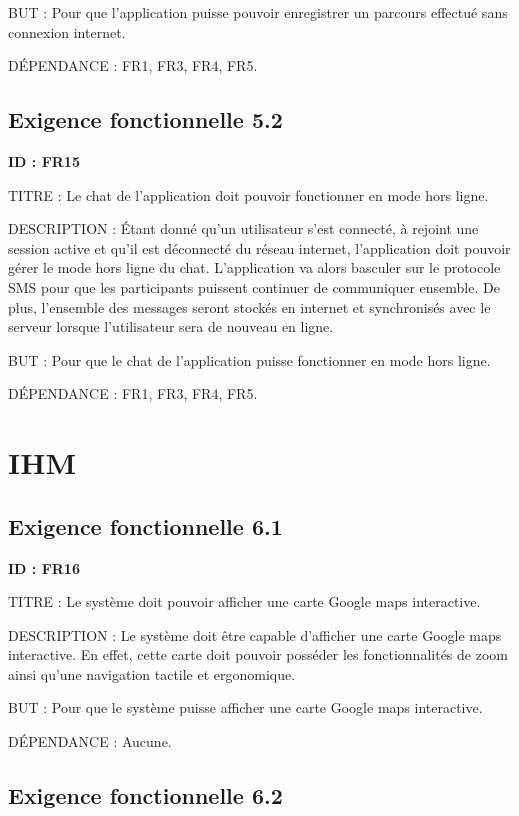 \documentclass[titlepage, 12pt]{report}
\begin{document}
BUT : Pour que l'application puisse pouvoir enregistrer un parcours effectué sans connexion internet. 

DÉPENDANCE : FR1, FR3, FR4, FR5.

\subsection{Exigence fonctionnelle 5.2}

\textbf{ID : FR15}

TITRE : Le chat de l'application doit pouvoir fonctionner en mode hors ligne.

DESCRIPTION : Étant donné qu'un utilisateur s'est connecté, à rejoint une session active et qu'il est déconnecté du réseau internet, l'application doit pouvoir gérer le mode hors ligne du chat. L'application va alors basculer sur le protocole SMS pour que les participants puissent continuer de communiquer ensemble. De plus, l'ensemble des messages seront stockés en internet et synchronisés avec le serveur lorsque l'utilisateur sera de nouveau en ligne.

BUT : Pour que le chat de l'application puisse fonctionner en mode hors ligne.

DÉPENDANCE : FR1, FR3, FR4, FR5.

\section{IHM}

\subsection{Exigence fonctionnelle 6.1}

\textbf{ID : FR16}

TITRE : Le système doit pouvoir afficher une carte Google maps interactive.

DESCRIPTION : Le système doit être capable d'afficher une carte Google maps interactive. En effet, cette carte doit pouvoir posséder les fonctionnalités de zoom ainsi qu'une navigation tactile et ergonomique.

BUT : Pour que le système puisse afficher une carte Google maps interactive.

DÉPENDANCE : Aucune.

\subsection{Exigence fonctionnelle 6.2}
\end{document}
